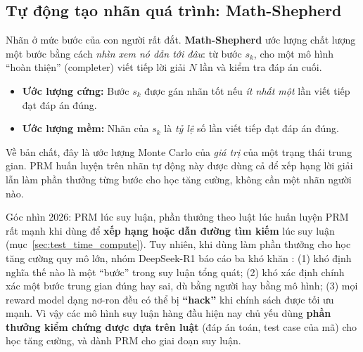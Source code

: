 \subsection{Tự động tạo nhãn quá trình: Math-Shepherd}
\label{ssec:math_shepherd}
Nhãn ở mức bước của con người rất đắt. \textbf{Math-Shepherd} \cite{wang2024mathshepherd} ước lượng chất lượng một bước bằng cách \emph{nhìn xem nó dẫn tới đâu}: từ bước $s_k$, cho một mô hình “hoàn thiện” (completer) viết tiếp lời giải $N$ lần và kiểm tra đáp án cuối.
\begin{itemize}
	\item \textbf{Ước lượng cứng:} Bước $s_k$ được gán nhãn tốt nếu \emph{ít nhất một} lần viết tiếp đạt đáp án đúng.
	\item \textbf{Ước lượng mềm:} Nhãn của $s_k$ là \emph{tỷ lệ} số lần viết tiếp đạt đáp án đúng.
\end{itemize}
Về bản chất, đây là ước lượng Monte Carlo của \emph{giá trị} của một trạng thái trung gian. PRM huấn luyện trên nhãn tự động này được dùng cả để xếp hạng lời giải lẫn làm phần thưởng từng bước cho học tăng cường, không cần một nhãn người nào.

\begin{pitfall}{Góc nhìn 2026: PRM lúc suy luận, phần thưởng theo luật lúc huấn luyện}
PRM rất mạnh khi dùng để \textbf{xếp hạng hoặc dẫn đường tìm kiếm} lúc suy luận (mục~\ref{sec:test_time_compute}). Tuy nhiên, khi dùng làm phần thưởng cho học tăng cường quy mô lớn, nhóm DeepSeek-R1 báo cáo ba khó khăn \cite{deepseekai2025r1}: (1) khó định nghĩa thế nào là một “bước” trong suy luận tổng quát; (2) khó xác định chính xác một bước trung gian đúng hay sai, dù bằng người hay bằng mô hình; (3) mọi reward model dạng nơ-ron đều có thể bị \textbf{“hack”} khi chính sách được tối ưu mạnh. Vì vậy các mô hình suy luận hàng đầu hiện nay chủ yếu dùng \textbf{phần thưởng kiểm chứng được dựa trên luật} (đáp án toán, test case của mã) cho học tăng cường, và dành PRM cho giai đoạn suy luận.
\end{pitfall}
